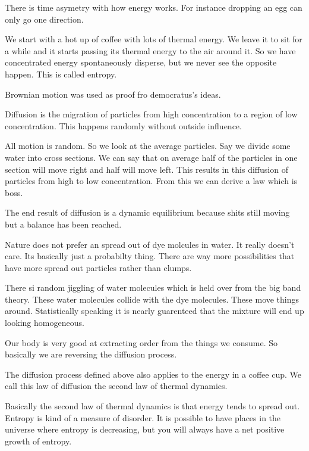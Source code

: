 \documentclass{article}
\begin{document}

There is time asymetry with how energy works. For instance dropping an egg can only go one direction.


We start with a hot up of coffee with lots of thermal energy. We leave it to sit for a while and it starts passing its thermal energy to the air around it. So we have concentrated energy spontaneously disperse, but we never see the opposite happen. This is called entropy.


Brownian motion was used as proof fro democratus's ideas.


Diffusion is the migration of particles from high concentration to a region of low concentration. This happens randomly without outside influence.


All motion is random. So we look at the average particles. Say we divide some water into cross sections. We can say that on average half of the particles in one section will move right and half will move left. This results in this diffusion of particles from high to low concentration. From this we can derive a law which is boss.


The end result of diffusion is a dynamic equilibrium because shits still moving but a balance has been reached.


Nature does not prefer an spread out of dye molcules in water. It really doesn't care. Its basically just a probabilty thing. There are way more possibilities that have more spread out particles rather than clumps.


There si random jiggling of water molecules which is held over from the big band theory. These water molecules collide with the dye molecules. These move things around. Statistically speaking it is nearly guarenteed that the mixture will end up looking homogeneous.

Our body is very good at extracting order from the things we consume. So basically we are reversing the diffusion process.


The diffusion process defined above also applies to the energy in a coffee cup. We call this law of diffusion the second law of thermal dynamics.


Basically the second law of thermal dynamics is that energy tends to spread out. Entropy is kind of a measure of disorder. It is possible to have places in the universe where entropy is decreasing, but you will always have a net positive growth of entropy.
\end{document}
